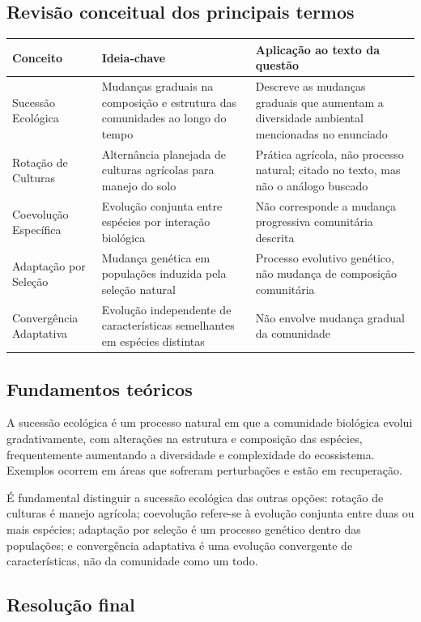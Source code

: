 \documentclass{article}
\begin{document}
\subsection*{Revisão conceitual dos principais termos}

\begin{tabular}{|p{3cm}|p{6cm}|p{6cm}|}
\hline
\textbf{Conceito} & \textbf{Ideia-chave} & \textbf{Aplicação ao texto da questão} \\ \hline
Sucessão Ecológica & Mudanças graduais na composição e estrutura das comunidades ao longo do tempo & Descreve as mudanças graduais que aumentam a diversidade ambiental mencionadas no enunciado \\ \hline
Rotação de Culturas & Alternância planejada de culturas agrícolas para manejo do solo & Prática agrícola, não processo natural; citado no texto, mas não o análogo buscado \\ \hline
Coevolução Específica & Evolução conjunta entre espécies por interação biológica & Não corresponde a mudança progressiva comunitária descrita \\ \hline
Adaptação por Seleção & Mudança genética em populações induzida pela seleção natural & Processo evolutivo genético, não mudança de composição comunitária \\ \hline
Convergência Adaptativa & Evolução independente de características semelhantes em espécies distintas & Não envolve mudança gradual da comunidade \\ \hline
\end{tabular}

\subsection*{Fundamentos teóricos}

A sucessão ecológica é um processo natural em que a comunidade biológica evolui gradativamente, com alterações na estrutura e composição das espécies, frequentemente aumentando a diversidade e complexidade do ecossistema. Exemplos ocorrem em áreas que sofreram perturbações e estão em recuperação.

É fundamental distinguir a sucessão ecológica das outras opções: rotação de culturas é manejo agrícola; coevolução refere-se à evolução conjunta entre duas ou mais espécies; adaptação por seleção é um processo genético dentro das populações; e convergência adaptativa é uma evolução convergente de características, não da comunidade como um todo.

\subsection*{Resolução final}
\end{document}
